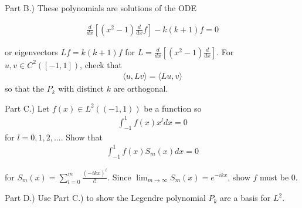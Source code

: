 \documentclass{article}
\begin{document}
	
	Part B.) These polynomials are solutions of the ODE
	
	\begin{align*}
		\frac{d}{dx} \left[ (x^{2}-1) \frac{d}{dx} f \right] -k(k+1)f = 0
	\end{align*}
	
	or eigenvectors $Lf = k(k+1)f$ for $L = \frac{d}{dx} \left[ (x^{2}-1) \frac{d}{dx} \right]$. For $u,v \in C^{2}([-1,1])$, check that 
	\begin{align*}
		\langle u,Lv \rangle = \langle Lu,v\rangle   
	\end{align*}
	so that the $P_{k}$ with distinct $k$ are orthogonal. 
	
	
	Part C.) Let $f(x) \in L^{2}((-1,1))$ be a function so 
	\begin{align*}
		\int_{-1}^{1} f(x)x^{l}dx = 0
	\end{align*}
	for $l=0,1,2,...$. Show that 
	\begin{align*}
		\int_{-1}^{1} f(x)S_m(x)dx = 0
	\end{align*}
	
	for $S_{m}(x) = \sum_{l=0}^{m} \frac{(-ikx)^{l}}{l!}$. Since $\lim_{m \to \infty} S_{m}(x) = e^{-ikx}$, show $f$ must be $0$. 
	
	Part D.) Use Part C.) to show the Legendre polynomial $P_{k}$ are a basis for $L^{2}$. 
	
	

	
\end{document}
